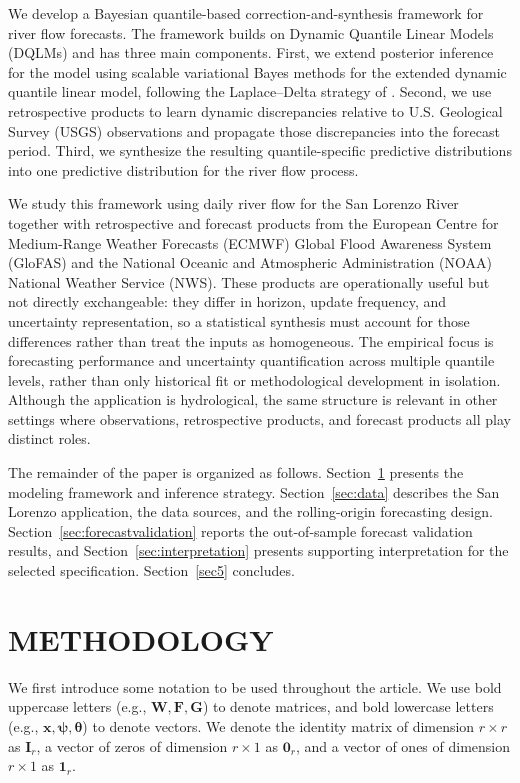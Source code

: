 \documentclass[APA,STIX1COL]{WileyNJD-v2}
\begin{document}
We develop a Bayesian quantile-based correction-and-synthesis framework for river flow forecasts. The framework builds on Dynamic Quantile Linear Models (DQLMs) \citep{goncalves, gourieroux2008dqlm, barata2021_flex_quantile} and has three main components. First, we extend posterior inference for the model using scalable variational Bayes methods for the extended dynamic quantile linear model, following the Laplace--Delta strategy of \citet{wang2013nonconjugatevb}. Second, we use retrospective products to learn dynamic discrepancies relative to U.S. Geological Survey (USGS) observations and propagate those discrepancies into the forecast period. Third, we synthesize the resulting quantile-specific predictive distributions into one predictive distribution for the river flow process.

We study this framework using daily river flow for the San Lorenzo River together with retrospective and forecast products from the European Centre for Medium-Range Weather Forecasts (ECMWF) Global Flood Awareness System (GloFAS) and the National Oceanic and Atmospheric Administration (NOAA) National Weather Service (NWS). These products are operationally useful but not directly exchangeable: they differ in horizon, update frequency, and uncertainty representation, so a statistical synthesis must account for those differences rather than treat the inputs as homogeneous. The empirical focus is forecasting performance and uncertainty quantification across multiple quantile levels, rather than only historical fit or methodological development in isolation. Although the application is hydrological, the same structure is relevant in other settings where observations, retrospective products, and forecast products all play distinct roles.

The remainder of the paper is organized as follows. Section~\ref{sec:methodology} presents the modeling framework and inference strategy. Section~\ref{sec:data} describes the San Lorenzo application, the data sources, and the rolling-origin forecasting design. Section~\ref{sec:forecastvalidation} reports the out-of-sample forecast validation results, and Section~\ref{sec:interpretation} presents supporting interpretation for the selected specification. Section~\ref{sec5} concludes.

\section{METHODOLOGY}
\label{sec:methodology}

We first introduce some notation to be used throughout the article. We use bold uppercase letters (e.g., $\mathbf{W}, \mathbf{F}, \mathbf{G}$) to denote matrices, and bold lowercase letters (e.g., $\mathbf{x}, \mathbf{\psi}, \mathbf{\theta}$) to denote vectors. We denote the identity matrix of dimension $r \times r$ as $\mathbf{I}_r$, a vector of zeros of dimension $r \times 1$ as $\mathbf{0}_r$, and a vector of ones of dimension $r \times 1$ as $\mathbf{1}_r$.
\end{document}
